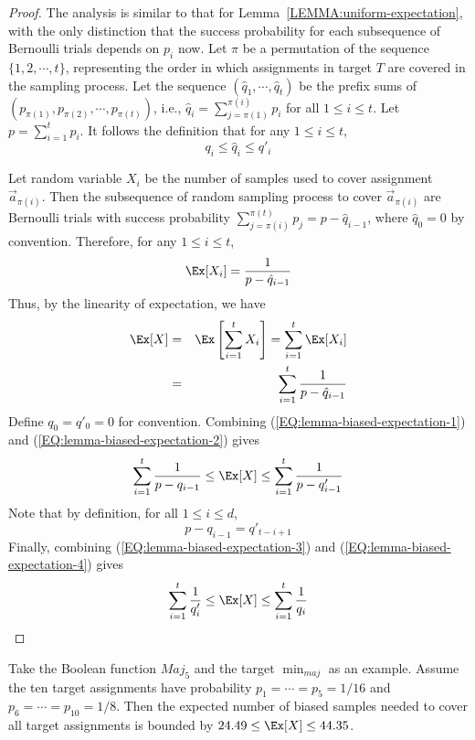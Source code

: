 \begin{proof}
The analysis is similar to that for
Lemma~\ref{LEMMA:uniform-expectation}, with the only distinction that
the success probability for each subsequence of Bernoulli trials depends
on $p_i$ now. Let $\pi$ be a permutation of the sequence $\{1, 2,
\cdots, t\}$, representing the order in which assignments in target $T$
are covered in the sampling process. Let the sequence $(\hat{q}_1,
\cdots, \hat{q}_t)$ be the prefix sums of $(p_{\pi(1)}, p_{\pi(2)},
\cdots, p_{\pi(t)})$, i.e., $\hat{q}_i = \sum_{j=\pi(1)}^{\pi(i)} p_i$
for all $1\le i\le t$. Let $p = \sum_{i=1}^t p_i$. It follows the
definition that for any $1\le i\le t$,
\begin{equation}
\label{EQ:lemma-biased-expectation-1}
  q_i \le \hat{q}_i \le q'_i
\end{equation}

Let random variable $X_i$ be the number of samples used to cover
assignment $\vec{a}_{\pi(i)}$. Then the subsequence of random sampling
process to cover $\vec{a}_{\pi(i)}$ are Bernoulli trials with success
probability $\sum_{j=\pi(i)}^{\pi(t)} p_j = p - \hat{q}_{i-1}$, where
$\hat{q}_0 = 0$ by convention. Therefore, for any $1\le i\le t$,
\[
  \Ex[X_i] = \frac{1}{p - \hat{q}_{i-1}}
\]
Thus, by the linearity of expectation, we have
\begin{eqnarray}
  \Ex[X] &=& \Ex\left[\sum_{i=1}^t X_i\right] = \sum_{i=1}^t \Ex[X_i]\nonumber\\
  &=& \sum_{i=1}^t \frac{1}{p - \hat{q}_{i-1}} \label{EQ:lemma-biased-expectation-2}
\end{eqnarray}
Define $q_0 = q'_0 = 0$ for convention. Combining (\ref{EQ:lemma-biased-expectation-1}) and (\ref{EQ:lemma-biased-expectation-2}) gives
\begin{equation}
\label{EQ:lemma-biased-expectation-3}
  \sum_{i=1}^t \frac{1}{p - q_{i-1}} \le \Ex[X] \le \sum_{i=1}^t \frac{1}{p - q'_{i-1}}
\end{equation}
Note that by definition, for all $1\le i\le d$,
\begin{equation}
\label{EQ:lemma-biased-expectation-4}
  p - q_{i-1} = q'_{t-i+1}
\end{equation}
Finally, combining (\ref{EQ:lemma-biased-expectation-3}) and (\ref{EQ:lemma-biased-expectation-4}) gives
\[
  \sum_{i=1}^t \frac{1}{q'_{i}} \le \Ex[X] \le \sum_{i=1}^t \frac{1}{q_{i}}
\]
\end{proof}

Take the Boolean function $Maj_5$ and the target $\min_{maj}$ as an
example. Assume the ten target assignments have probability $p_1 =
\cdots = p_5 = 1/16$ and $p_6 = \cdots = p_{10} = 1/8$. Then the
expected number of biased samples needed to cover all target assignments
is bounded by $24.49 \le \Ex[X] \le 44.35$.

